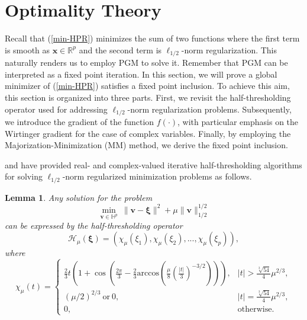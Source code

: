 \documentclass{article}
\newtheorem{lemma}[theorem]{Lemma}
\numberwithin{equation}{section}
\begin{document}
\section{Optimality Theory}\label{FPE}
Recall that  (\ref{min-HPR}) minimizes the sum of two functions where the first term is smooth as $\mathbf{x}\in\mathbb{R}^p$ and the second term is $\ell_{1/2}$-norm regularization. 
This naturally renders us to employ PGM to solve it. Remember  that PGM can be interpreted as a fixed point iteration. In this section, we will prove a global minimizer of (\ref{min-HPR}) satisfies a fixed point inclusion.  To achieve this aim, this section is organized into three parts. First, we revisit the half-thresholding operator used for addressing $\ell_{1/2}$-norm regularization problems. Subsequently, we introduce the gradient of the function $f(\cdot)$, with particular emphasis on the Wirtinger gradient for the case of complex variables. Finally, by employing the Majorization-Minimization (MM) method, we derive the fixed point inclusion.


\cite{2012L} and \cite{zeng2012sparse} have provided real- and complex-valued iterative half-thresholding algorithms for solving $\ell_{1/2}$-norm regularized minimization problems as follows.
\begin{lemma}\label{half-solution} Any solution for the problem
	\begin{equation}
		\min\limits_{\mathbf{v}\in \mathbb{H}^p}~\|\mathbf{v}-\mathbf{\xi}\|^2+\mu\|\mathbf{v}\|_{1/2}^{1/2}\nonumber
	\end{equation}
 can be expressed by the half-thresholding operator
	\begin{equation}
		\mathcal{H}_{\mu}(\mathbf{\xi})=(\chi_\mu(\xi_1),\chi_\mu(\xi_2),...,\chi_\mu(\xi_p)),\nonumber
	\end{equation}
	where
	\begin{equation}
		\chi_\mu(t)=
		\begin{cases}
			{\frac{2}{3}t(1+\cos(\frac{2\pi}{3}-\frac{2}{3}\mathrm{arccos}(\frac{\mu}{8}(\frac{|t|}{3})^{-3/2}))),}&{|t|>\frac{\sqrt[3]{54}}{4}\mu^{2/3}},\nonumber\\
			{(\mu/2)^{2/3}~\mathrm{or}~0,} &{|t|=\frac{\sqrt[3]{54}}{4}\mu^{2/3}},\\
			{0,}&\textrm{otherwise}.\nonumber
		\end{cases}
	\end{equation}
\end{lemma}
\end{document}

